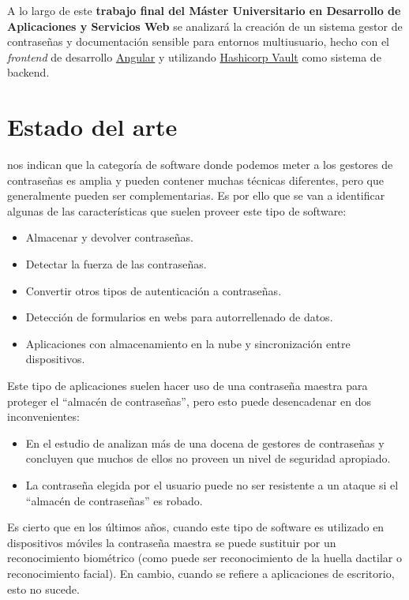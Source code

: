 \documentclass{\ClassPath/viu-tfm-template}
\begin{document}
A lo largo de este \textbf{trabajo final del Máster Universitario en Desarrollo de Aplicaciones y Servicios Web} se analizará la creación de un sistema gestor de contraseñas y documentación sensible para entornos multiusuario, hecho con el \textit{frontend} de desarrollo \href{https://angular.io/}{Angular} y utilizando  \href{https://www.vaultproject.io/}{Hashicorp Vault} como sistema de backend.



\chapter{Estado del arte}

\textcite{tapas} nos indican que la categoría de software donde podemos meter a los gestores de contraseñas es amplia y pueden contener muchas técnicas diferentes, pero que generalmente pueden ser complementarias. Es por ello que se van a identificar algunas de las características que suelen proveer este tipo de software:

\begin{itemize}
    \item Almacenar y devolver contraseñas.
    \item Detectar la fuerza de las contraseñas.
    \item Convertir otros tipos de autenticación a contraseñas.
    \item Detección de formularios en webs para autorrellenado de datos.
    \item Aplicaciones con almacenamiento en la nube y sincronización entre dispositivos.
\end{itemize}

Este tipo de aplicaciones suelen hacer uso de una contraseña maestra para proteger el “almacén de contraseñas”, pero esto puede desencadenar en dos inconvenientes:

\begin{itemize}
    \item En el estudio de \textcite{belenko2012secure} analizan más de una docena de gestores de contraseñas y concluyen que muchos de ellos no proveen un nivel de seguridad apropiado.

    \item La contraseña elegida por el usuario puede no ser resistente a un ataque si el “almacén de contraseñas” es robado.
\end{itemize}

Es cierto que en los últimos años, cuando este tipo de software es utilizado en dispositivos móviles la contraseña maestra se puede sustituir por un reconocimiento biométrico (como puede ser reconocimiento de la huella dactilar o reconocimiento facial). En cambio, cuando se refiere a aplicaciones de escritorio, esto no sucede.
\end{document}
